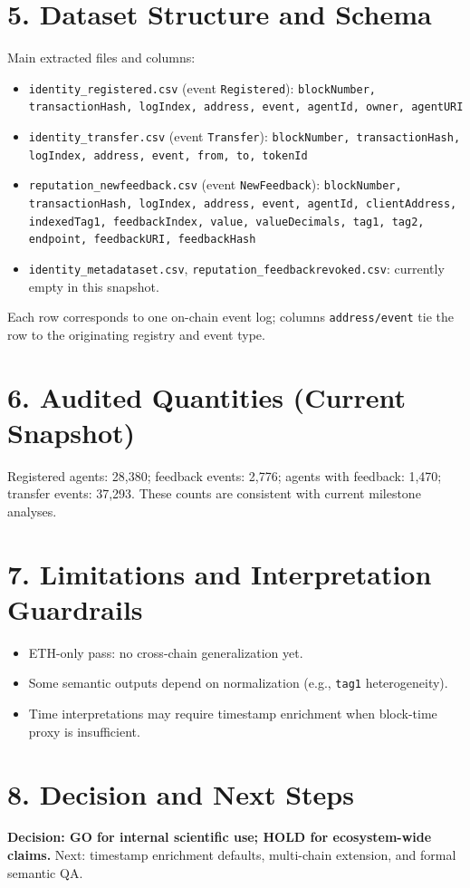 \documentclass[11pt,a4paper]{article}
\begin{document}
\section*{5. Dataset Structure and Schema}
Main extracted files and columns:
\begin{itemize}
\item \texttt{identity\_registered.csv} (event \texttt{Registered}):
\texttt{blockNumber, transactionHash, logIndex, address, event, agentId, owner, agentURI}
\item \texttt{identity\_transfer.csv} (event \texttt{Transfer}):
\texttt{blockNumber, transactionHash, logIndex, address, event, from, to, tokenId}
\item \texttt{reputation\_newfeedback.csv} (event \texttt{NewFeedback}):
\texttt{blockNumber, transactionHash, logIndex, address, event, agentId, clientAddress, indexedTag1, feedbackIndex, value, valueDecimals, tag1, tag2, endpoint, feedbackURI, feedbackHash}
\item \texttt{identity\_metadataset.csv}, \texttt{reputation\_feedbackrevoked.csv}: currently empty in this snapshot.
\end{itemize}

Each row corresponds to one on-chain event log; columns \texttt{address/event} tie the row to the originating registry and event type.

\section*{6. Audited Quantities (Current Snapshot)}
Registered agents: 28,380; feedback events: 2,776; agents with feedback: 1,470; transfer events: 37,293.
These counts are consistent with current milestone analyses.

\section*{7. Limitations and Interpretation Guardrails}
\begin{itemize}
\item ETH-only pass: no cross-chain generalization yet.
\item Some semantic outputs depend on normalization (e.g., \texttt{tag1} heterogeneity).
\item Time interpretations may require timestamp enrichment when block-time proxy is insufficient.
\end{itemize}

\section*{8. Decision and Next Steps}
\textbf{Decision: GO for internal scientific use; HOLD for ecosystem-wide claims.}
Next: timestamp enrichment defaults, multi-chain extension, and formal semantic QA.
\end{document}
